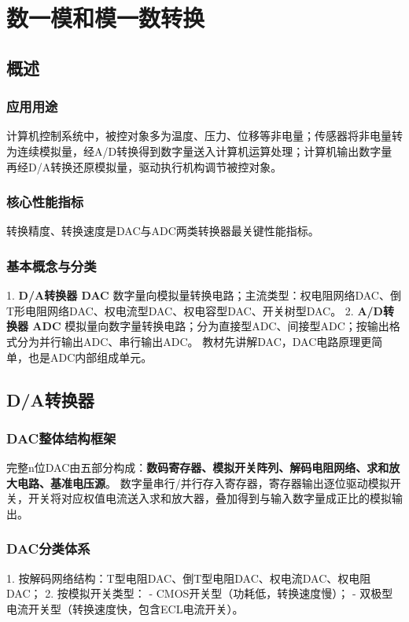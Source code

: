 \setlength{\parskip}{0.4em}
\setlength{\itemsep}{0.2em}
\setlength{\tabcolsep}{4pt}

\chapter{数一模和模一数转换}
\section{概述}
\subsection{应用用途}
计算机控制系统中，被控对象多为温度、压力、位移等非电量；传感器将非电量转为连续模拟量，经A/D转换得到数字量送入计算机运算处理；计算机输出数字量再经D/A转换还原模拟量，驱动执行机构调节被控对象。

\subsection{核心性能指标}
转换精度、转换速度是DAC与ADC两类转换器最关键性能指标。

\subsection{基本概念与分类}
1. \textbf{D/A转换器 DAC}
数字量向模拟量转换电路；主流类型：权电阻网络DAC、倒T形电阻网络DAC、权电流型DAC、权电容型DAC、开关树型DAC。
2. \textbf{A/D转换器 ADC}
模拟量向数字量转换电路；分为直接型ADC、间接型ADC；按输出格式分为并行输出ADC、串行输出ADC。
教材先讲解DAC，DAC电路原理更简单，也是ADC内部组成单元。

\section{D/A转换器}
\subsection{DAC整体结构框架}
完整n位DAC由五部分构成：\textbf{数码寄存器、模拟开关阵列、解码电阻网络、求和放大电路、基准电压源}。
数字量串行/并行存入寄存器，寄存器输出逐位驱动模拟开关，开关将对应权值电流送入求和放大器，叠加得到与输入数字量成正比的模拟输出。

\subsection{DAC分类体系}
1. 按解码网络结构：T型电阻DAC、倒T型电阻DAC、权电流DAC、权电阻DAC；
2. 按模拟开关类型：
    - CMOS开关型（功耗低，转换速度慢）；
    - 双极型电流开关型（转换速度快，包含ECL电流开关）。

